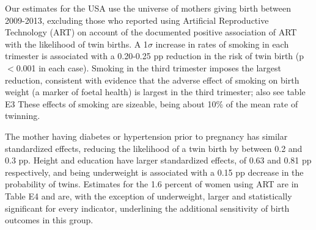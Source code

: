 \documentclass{nature}
\begin{document}
\begin{linenumbers}
Our estimates for the USA use the universe of mothers giving birth between 2009-2013, excluding those who reported using Artificial Reproductive Technology (ART) on account of the documented positive association of ART with the likelihood of twin births\cite{Vitthalaetal2009}. A 1$\sigma$ increase in rates of smoking in each trimester is associated with a 0.20-0.25 pp reduction in the risk of twin birth (p$<$0.001 in each case). Smoking in the third trimester imposes the largest reduction, consistent with evidence that the adverse effect of smoking on birth weight (a marker of foetal health) is largest in the third trimester\cite{Bernsteinetal2005}; also see table E3 %
These effects of smoking are sizeable, being about 10\% of the mean rate of twinning. 


The mother having diabetes or hypertension prior to pregnancy has similar standardized effects, reducing the likelihood of a twin birth by between 0.2 and 0.3 pp. Height and education have larger standardized effects, of 0.63 and 0.81 pp respectively, and being underweight is associated with a 0.15 pp decrease in the probability of twins. Estimates for the 1.6 percent of women using ART are in Table E4 and are, with the exception of underweight, larger and statistically significant for every indicator, underlining the additional sensitivity of birth outcomes in this group. 



\end{linenumbers}
\end{document}
